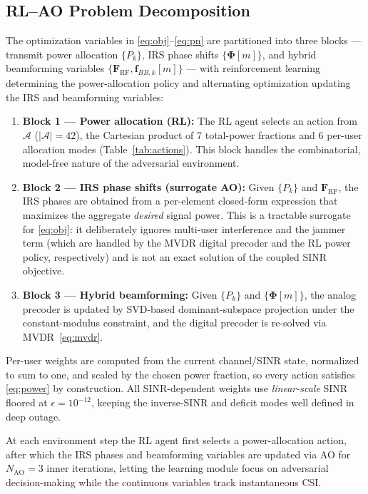 \documentclass[10pt,conference]{IEEEtran}
\newcommand{\vect}[1]{\mathbf{#1}}
\newcommand{\mat}[1]{\mathbf{#1}}
\begin{document}
\subsection{RL--AO Problem Decomposition}

The optimization variables in \eqref{eq:obj}--\eqref{eq:pn} are partitioned into three blocks --- transmit power allocation $\{P_k\}$, IRS phase shifts $\{\boldsymbol{\Phi}[m]\}$, and hybrid beamforming variables $\{\mat{F}_{\mathrm{RF}},\vect{f}_{BB,k}[m]\}$ --- with reinforcement learning determining the power-allocation policy and alternating optimization updating the IRS and beamforming variables:
\begin{enumerate}
\item \textbf{Block 1 --- Power allocation (RL):} The RL agent selects an action from $\mathcal{A}$ ($|\mathcal{A}|=42$), the Cartesian product of 7 total-power fractions and 6 per-user allocation modes (Table~\ref{tab:actions}). This block handles the combinatorial, model-free nature of the adversarial environment.
\item \textbf{Block 2 --- IRS phase shifts (surrogate AO):} Given $\{P_k\}$ and $\mat{F}_{\text{RF}}$, the IRS phases are obtained from a per-element closed-form expression that maximizes the aggregate \emph{desired} signal power. This is a tractable surrogate for \eqref{eq:obj}: it deliberately ignores multi-user interference and the jammer term (which are handled by the MVDR digital precoder and the RL power policy, respectively) and is not an exact solution of the coupled SINR objective.
\item \textbf{Block 3 --- Hybrid beamforming:} Given $\{P_k\}$ and $\{\bm{\Phi}[m]\}$, the analog precoder is updated by SVD-based dominant-subspace projection under the constant-modulus constraint, and the digital precoder is re-solved via MVDR~\eqref{eq:mvdr}.
\end{enumerate}

Per-user weights are computed from the current channel/SINR state, normalized to sum to one, and scaled by the chosen power fraction, so every action satisfies \eqref{eq:power} by construction. All SINR-dependent weights use \emph{linear-scale} SINR floored at $\epsilon = 10^{-12}$, keeping the inverse-SINR and deficit modes well defined in deep outage.

At each environment step the RL agent first selects a power-allocation action, after which the IRS phases and beamforming variables are updated via AO for $N_{\mathrm{AO}}=3$ inner iterations, letting the learning module focus on adversarial decision-making while the continuous variables track instantaneous CSI.
\end{document}
